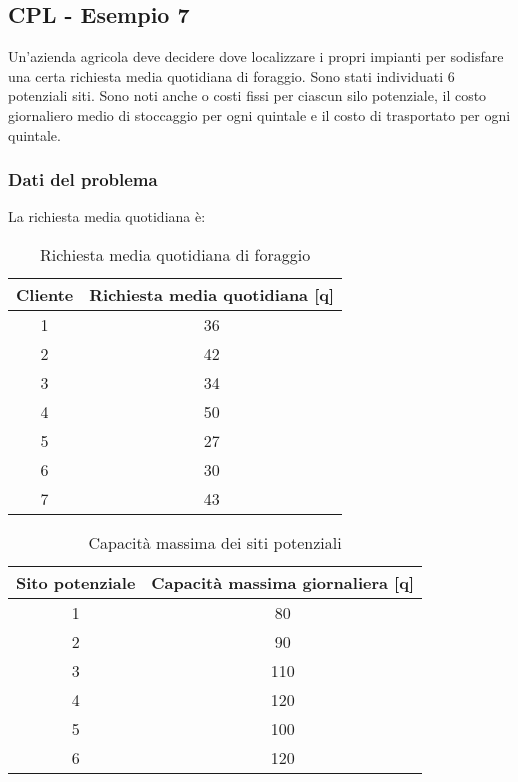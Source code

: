 \subsection{CPL - Esempio 7}
Un'azienda agricola deve decidere dove localizzare i propri impianti 
per sodisfare una certa richiesta media quotidiana di foraggio. 
Sono stati individuati 6 potenziali siti. Sono noti anche o costi fissi per 
ciascun silo potenziale, il costo giornaliero medio di stoccaggio per ogni quintale e 
il costo di trasportato per ogni quintale.

\subsubsection{Dati del problema}

La richiesta media quotidiana è:
\begin{table}[htbp]
    \centering
    \caption{Richiesta media quotidiana di foraggio}
    \begin{tabular}{|c|c|}
        \hline
        \textbf{Cliente} & \textbf{Richiesta media quotidiana [q]} \\
        \hline
        1 & 36 \\
        2 & 42 \\
        3 & 34 \\
        4 & 50 \\
        5 & 27 \\
        6 & 30 \\
        7 & 43 \\
        \hline
    \end{tabular}
\end{table}

\begin{table}[htbp]
    \centering
    \caption{Capacità massima dei siti potenziali}
    \begin{tabular}{|c|c|}
        \hline
        \textbf{Sito potenziale} & \textbf{Capacità massima giornaliera [q]} \\
        \hline
        1 & 80 \\
        2 & 90 \\
        3 & 110 \\
        4 & 120 \\
        5 & 100 \\
        6 & 120 \\
        \hline
    \end{tabular}
\end{table}

